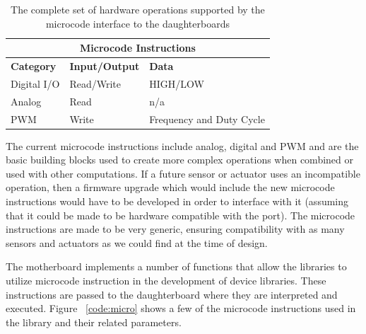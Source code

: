 	\begin{table}[h] 
        \centering
          \scriptsize {%
	      \begin{tabular}{|l|l|l|}
            \toprule
	        \multicolumn{3}{c}{\textbf{Microcode Instructions}} \\\hline
            \textbf{Category} & \textbf{Input/Output} & \textbf{Data}\\\hline
            Digital I/O  & Read/Write & HIGH/LOW \\\hline
            Analog & Read & n/a \\\hline
            PWM & Write & Frequency and Duty Cycle \\\hline
            \end{tabular} 
            }
	  \caption{The complete set of hardware operations supported by the
	    microcode interface to the daughterboards}%
	  \label{tab:microcode}
	\end{table}
	\normalsize
	
 The current microcode instructions include analog, digital and PWM and are the basic building blocks used to create more complex operations when combined or used with other computations. If a future sensor or actuator uses an incompatible operation, then a firmware upgrade which would include the new microcode instructions would have to be developed in order to interface with it (assuming that it could be made to be hardware compatible with the port). The microcode instructions are made to be very generic, ensuring compatibility with as many sensors and actuators as we could find at the time of design.

	The motherboard implements a number of functions that allow the libraries to utilize microcode instruction in the development of device libraries. These instructions are passed to the daughterboard where they are interpreted and executed. Figure ~\ref{code:micro} shows a few of the microcode instructions used in the \xten library and their related parameters.
	
